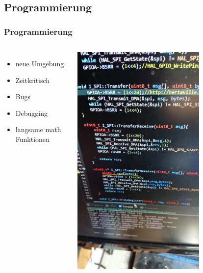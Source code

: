 \documentclass[12pt,a4paper, ngerman]{beamer}
\begin{document}
\begin{frame}
\begin{columns}
\begin{center}
\end{center}
\end{columns}
\end{frame}

\subsection{Programmierung}
 
\begin{frame}
\frametitle{Programmierung}
\begin{columns}
\begin{itemize}
\item neue Umgebung
\item Zeitkritisch
\item Bugs
\item Debugging
\item langsame math. Funktionen
\end{itemize}
\begin{center}
\includegraphics[width=0.7\textwidth]{Prgm1.jpg}
\end{center}
\end{columns}
\end{frame}
\end{document}
